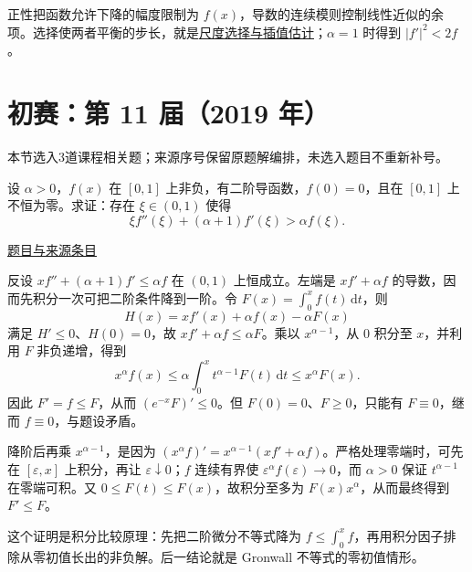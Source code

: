 \documentclass[12pt,fontset=fandol]{ctexart}
\begin{document}
\begin{remark}[方法与条件]正性把函数允许下降的幅度限制为 $f(x)$，导数的连续模则控制线性近似的余项。选择使两者平衡的步长，就是\hyperref[app:estimate-interpolation]{尺度选择与插值估计}；$\alpha=1$ 时得到 $|f'|^2<2f$。\end{remark}

\section{初赛：第 11 届（2019 年）}

本节选入3道课程相关题；来源序号保留原题解编排，未选入题目不重新补号。

\begin{example}[来源序号2]\label{ex:ch10-11th-A:2}\label{pr:ch10-11th-A:2}

设 $\alpha>0$，$f(x)$ 在 $[0,1]$ 上非负，有二阶导函数，$f(0)=0$，且在 $[0,1]$ 上不恒为零。求证：存在 $\xi\in(0,1)$ 使得
\[
\xi f''(\xi)+(\alpha+1)f'(\xi)>\alpha f(\xi).
\]

\par\href{https://github.com/lzxcr/cmc-mathematics/blob/64916fa1fdbc3e444a652eca204d5669058ee321/src/problems/preliminary/11/02.md}{题目与来源条目}

\end{example}

\begin{solve}\label{ans:ch10-11th-A:2}

反设 $xf''+(\alpha+1)f'\leq\alpha f$ 在 $(0,1)$ 上恒成立。左端是 $xf'+\alpha f$ 的导数，因而先积分一次可把二阶条件降到一阶。令 $F(x)=\int_0^x f(t)\,\mathrm dt$，则
\[
H(x)=xf'(x)+\alpha f(x)-\alpha F(x)
\]
满足 $H'\leq0$、$H(0)=0$，故 $xf'+\alpha f\leq\alpha F$。乘以 $x^{\alpha-1}$，从 $0$ 积分至 $x$，并利用 $F$ 非负递增，得到
\[
x^\alpha f(x)
\leq\alpha\int_0^x t^{\alpha-1}F(t)\,\mathrm dt
\leq x^\alpha F(x).
\]
因此 $F'=f\leq F$，从而 $(e^{-x}F)'\leq0$。但 $F(0)=0$、$F\geq0$，只能有 $F\equiv0$，继而 $f\equiv0$，与题设矛盾。

降阶后再乘 $x^{\alpha-1}$，是因为 $(x^\alpha f)'=x^{\alpha-1}(xf'+\alpha f)$。严格处理零端时，可先在 $[\varepsilon,x]$ 上积分，再让 $\varepsilon\downarrow0$；$f$ 连续有界使 $\varepsilon^\alpha f(\varepsilon)\to0$，而 $\alpha>0$ 保证 $t^{\alpha-1}$ 在零端可积。又 $0\le F(t)\le F(x)$，故积分至多为 $F(x)x^\alpha$，从而最终得到 $F'\le F$。

\end{solve}

\begin{remark}[方法与条件]这个证明是积分比较原理：先把二阶微分不等式降为 $f\leq\int_0^x f$，再用积分因子排除从零初值长出的非负解。后一结论就是 Gronwall 不等式的零初值情形。\end{remark}
\end{document}
